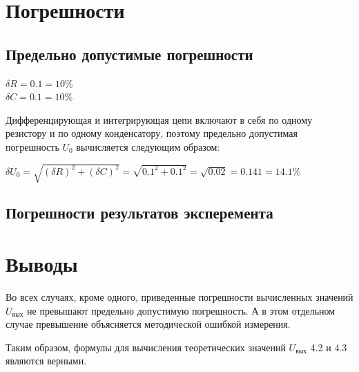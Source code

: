 \section{Погрешности}

\subsection{Предельно допустимые погрешности}

\begin{center}
$\delta R = 0.1 = 10\%$\\
$\delta C = 0.1 = 10\%$\\
\end{center}

Дифференцирующая и интегрирующая цепи включают в себя по одному резистору и по одному конденсатору, поэтому предельно допустимая погрешность $U_0$ вычисляется следующим образом:


$\delta U_0 = \sqrt{(\delta R)^2 + (\delta C)^2} = \sqrt{0.1^2 + 0.1^2} = \sqrt{0.02} = 0.141 = 14.1 \%$

\subsection{Погрешности результатов эксперемента} %

  
\section{Выводы}

Во всех случаях, кроме одного, приведенные погрешности вычисленных значений $U_\text{вых}$ не превышают предельно допустимую погрешность. А в этом отдельном случае превышение объясняется методической ошибкой измерения.

Таким образом, формулы для вычисления теоретических значений $U_\text{вых}$ 4.2 и 4.3 являются верными.


